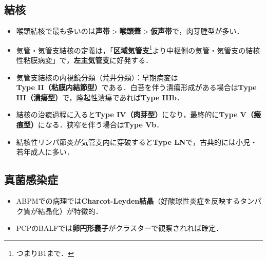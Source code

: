 \subsection{結核}
\begin{itemize}

\item 喉頭結核で最も多いのは\textbf{声帯$>$喉頭蓋$>$仮声帯}で，肉芽腫型が多い．
\item 気管・気管支結核の定義は，「\textbf{区域気管支}\footnote{つまりB1まで．}より中枢側の気管・気管支の結核性粘膜病変」で，\textbf{左主気管支}に好発する．
\item 気管支結核の内視鏡分類（荒井分類）：早期病変は\textbf{Type II（粘膜内結節型）}である．白苔を伴う潰瘍形成がある場合は\textbf{Type III（潰瘍型）}で，隆起性潰瘍であれば\textbf{Type IIIb}．
\item 結核の治癒過程に入ると\textbf{Type IV（肉芽型）}になり，最終的に\textbf{Type V（瘢痕型）}になる．狭窄を伴う場合は\textbf{Type Vb}．

\item 結核性リンパ節炎が気管支内に穿破すると\textbf{Type LN}で，古典的には小児・若年成人に多い．

\end{itemize}


\subsection{真菌感染症}

\begin{itemize}

\item ABPMでの病理では\textbf{Charcot-Leyden結晶}（好酸球性炎症を反映するタンパク質が結晶化）が特徴的．
\item PCPのBALFでは\textbf{卵円形嚢子}がクラスターで観察されれば確定．
\end{itemize}

